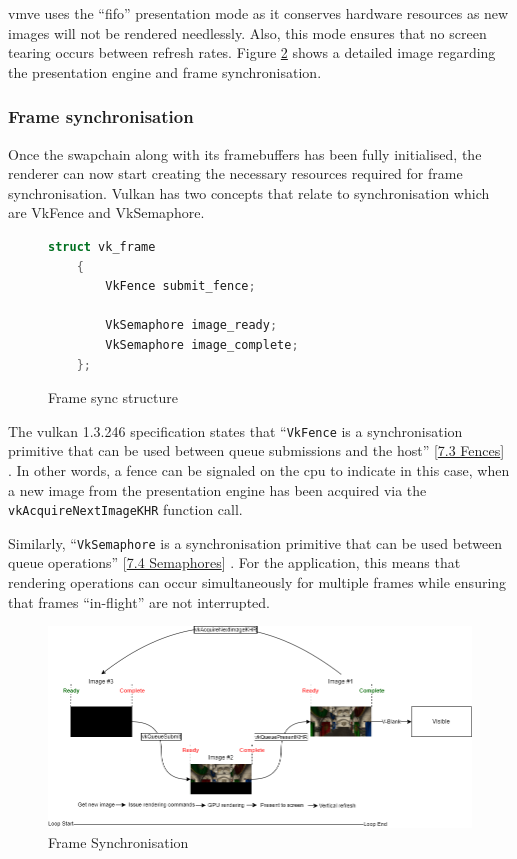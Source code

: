 \documentclass[11pt]{article}
\begin{document}
\gls*{vmve} uses the ``fifo'' presentation mode as it conserves hardware
resources as new images will not be rendered needlessly. Also, this mode ensures
that no screen tearing occurs between refresh rates. Figure \ref{fig:frame_sync}
shows a detailed image regarding the presentation engine and frame
synchronisation.

\subsubsection{Frame synchronisation}
Once the swapchain along with its framebuffers has been fully initialised, the
renderer can now start creating the necessary resources required for frame
synchronisation. Vulkan has two concepts that relate to synchronisation which
are VkFence and VkSemaphore.

\begin{figure}[H]
  \centering
  \begin{lstlisting}[language=C++]
    struct vk_frame
    {
        VkFence submit_fence;

        VkSemaphore image_ready;
        VkSemaphore image_complete;
    };
  \end{lstlisting}
  \caption{Frame sync structure}
  \label{fig:vk_fence}
\end{figure}

The \gls*{vulkan} 1.3.246 specification states that  ``\lstinline{VkFence} is a
synchronisation primitive that can be used between queue submissions and the
host''
[\href{https://registry.khronos.org/vulkan/specs/1.3-extensions/man/html/VkFence.html}{7.3
Fences}] \cite{vulkan-spec}. In other words, a fence can be signaled on the
\gls*{cpu} to indicate in this case, when a new image from the presentation
engine has been acquired via the \lstinline{vkAcquireNextImageKHR} function
call.

Similarly, ``\lstinline{VkSemaphore} is a synchronisation primitive that can be
used between queue operations''
[\href{https://registry.khronos.org/vulkan/specs/1.3-extensions/man/html/VkSemaphore.html}{7.4
Semaphores}] \cite{vulkan-spec}. For the application, this means that rendering
operations can occur simultaneously for multiple frames while ensuring that
frames ``in-flight'' are not interrupted.


\begin{figure}[H]
  \centering
  \includegraphics[width=\textwidth]{images/frame_sync.png}
  \caption{Frame Synchronisation}
  \label{fig:frame_sync}
\end{figure}
\end{document}
